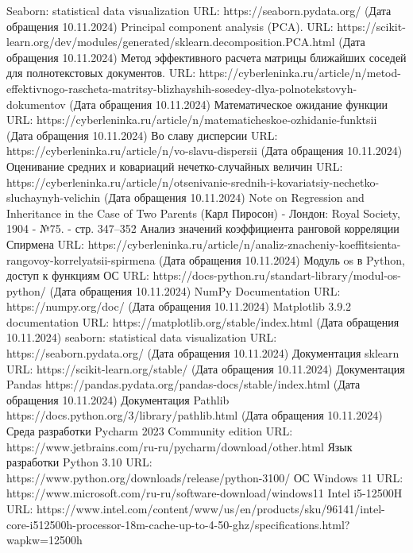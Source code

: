 \begin{thebibliography}{}
	Seaborn: statistical data visualization
	URL: https://seaborn.pydata.org/ (Дата обращения 10.11.2024)
	Principal component analysis (PCA).
	URL: https://scikit-learn.org/dev/modules/generated/sklearn.decomposition.PCA.html (Дата обращения 10.11.2024)
	Метод эффективного расчета матрицы ближайших соседей для полнотекстовых документов.
	URL: https://cyberleninka.ru/article/n/metod-effektivnogo-rascheta-matritsy-blizhayshih-sosedey-dlya-polnotekstovyh-dokumentov (Дата обращения 10.11.2024)
	Математическое ожидание функции
	URL: https://cyberleninka.ru/article/n/matematicheskoe-ozhidanie-funktsii (Дата обращения 10.11.2024)
	Во славу дисперсии
	URL: https://cyberleninka.ru/article/n/vo-slavu-dispersii (Дата обращения 10.11.2024)
	Оценивание средних и ковариаций нечетко-случайных величин
	URL: https://cyberleninka.ru/article/n/otsenivanie-srednih-i-kovariatsiy-nechetko-sluchaynyh-velichin (Дата обращения 10.11.2024)
	Note on Regression and Inheritance in the Case of Two Parents (Карл Пиросон) - Лондон: Royal Society, 1904 - №75. - стр. 347–352
	Анализ значений коэффициента ранговой корреляции Спирмена
	URL: https://cyberleninka.ru/article/n/analiz-znacheniy-koeffitsienta-rangovoy-korrelyatsii-spirmena (Дата обращения 10.11.2024)
	Модуль os в Python, доступ к функциям ОС
    URL: https://docs-python.ru/standart-library/modul-os-python/  (Дата обращения 10.11.2024)
	NumPy Documentation
    URL: https://numpy.org/doc/ (Дата обращения 10.11.2024)
	Matplotlib 3.9.2 documentation
    URL: https://matplotlib.org/stable/index.html (Дата обращения 10.11.2024)
	seaborn: statistical data visualization
    URL: https://seaborn.pydata.org/ (Дата обращения 10.11.2024)
	Документация sklearn
    URL: https://scikit-learn.org/stable/ (Дата обращения 10.11.2024)
	Документация Pandas
	https://pandas.pydata.org/pandas-docs/stable/index.html (Дата обращения 10.11.2024)
	Документация Pathlib
	https://docs.python.org/3/library/pathlib.html (Дата обращения 10.11.2024)
	Среда разработки Pycharm 2023 Community edition
	URL: https://www.jetbrains.com/ru-ru/pycharm/download/other.html
	Язык разработки Python 3.10
	URL: https://www.python.org/downloads/release/python-3100/
	ОС Windows 11
	URL: https://www.microsoft.com/ru-ru/software-download/windows11
	Intel i5-12500H
	URL: https://www.intel.com/content/www/us/en/products/sku/96141/intel-core-i512500h-processor-18m-cache-up-to-4-50-ghz/specifications.html?wapkw=12500h
\end{thebibliography}